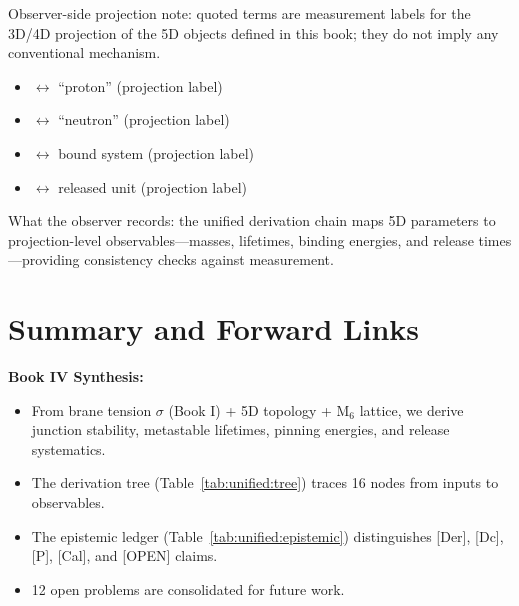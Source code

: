 \begin{observerbox}
Observer-side projection note: quoted terms are measurement labels for the
3D/4D projection of the 5D objects defined in this book; they do not
imply any conventional mechanism.

\begin{itemize}
    \item \AnchorJunction{} $\leftrightarrow$ ``proton'' (projection label)
    \item \MetastableJunction{} $\leftrightarrow$ ``neutron'' (projection label)
    \item \ClusterState{} $\leftrightarrow$ bound system (projection label)
    \item \ClosedFour{} $\leftrightarrow$ released unit (projection label)
\end{itemize}

What the observer records: the unified derivation chain maps 5D parameters
to projection-level observables---masses, lifetimes, binding energies,
and release times---providing consistency checks against measurement.
\end{observerbox}

\section{Summary and Forward Links}
\label{sec:unified:summary}

\begin{resultbox}
    \textbf{Book IV Synthesis:}
    \begin{itemize}
        \item From brane tension $\sigma$ (Book I) + 5D topology + M$_6$
              lattice, we derive junction stability, metastable lifetimes,
              pinning energies, and release systematics.
        \item The derivation tree (Table~\ref{tab:unified:tree}) traces
              16 nodes from inputs to observables.
        \item The epistemic ledger (Table~\ref{tab:unified:epistemic})
              distinguishes [Der], [Dc], [P], [Cal], and [OPEN] claims.
        \item 12 open problems are consolidated for future work.
    \end{itemize}
\end{resultbox}

